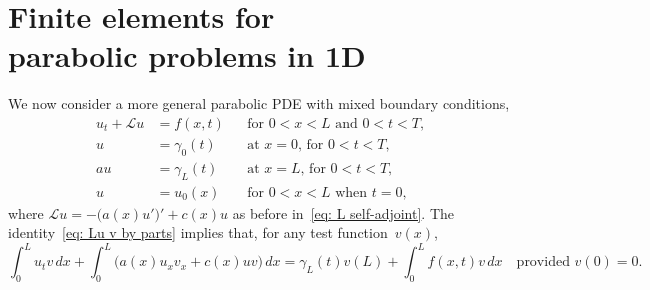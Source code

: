 \chapter[Finite elements for parabolic problems]{Finite elements for \\
parabolic problems in 1D}

We now consider a more general parabolic PDE with mixed boundary conditions,
\begin{equation}\label{eq: parabolic ivp 1d}
\begin{aligned}
u_t+\mathcal{L}u&=f(x,t)&&\text{for $0<x<L$ and $0<t<T$,}\\
u&=\gamma_0(t)&&\text{at $x=0$, for $0<t<T$,}\\
au&=\gamma_L(t)&&\text{at $x=L$, for $0<t<T$,}\\
u&=u_0(x)&&\text{for $0<x<L$ when $t=0$,}
\end{aligned}
\end{equation}
where $\mathcal{L}u=-\bigl(a(x)u'\bigr)'+c(x)u$ as before 
in~\eqref{eq: L self-adjoint}.  The identity~\eqref{eq: Lu v by parts} implies 
that, for any test function~$v(x)$,
\[
\int_0^Lu_tv\,dx+\int_0^L\bigl(a(x)u_xv_x+c(x)uv\bigr)\,dx
	=\gamma_L(t)v(L)+\int_0^Lf(x,t)v\,dx
\quad\text{provided $v(0)=0$.}
\]

